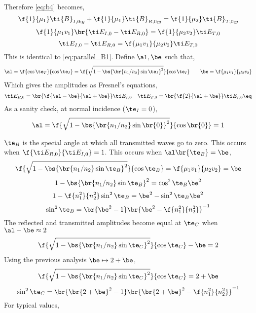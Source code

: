 \documentclass{article}
\begin{document}
Therefore \cref{eq:b4} becomes,
\[ \f{1}{\mu_1}\ti {B}_{I, 0; y} + \f{1}{\mu_1}\ti {B}_{R, 0; y} = \f{1}{\mu_2}\ti {B}_{T, 0; y} \]
\[ \f{1}{\mu_1v_1}\br{\ti E_{I, 0} - \ti E_{R, 0}} = \f{1}{\mu_2 v_2} \ti E_{T, 0} \]
\[ \ti E_{I, 0} - \ti E_{R, 0} = \f{\mu_1 v_1}{\mu_2 v_2} \ti E_{T, 0} \]
This is identical to \cref{eq:parallel_B1}. Define $\al, \be$ such that,
\[ \al = \f{\cos \te_T}{\cos \te_I} = \f{\sqrt{1 - \bs{\br{n_1 /n_2} \sin \te_I}^2}}{\cos \te_I} \qquad \be = \f{\mu_1 v_1}{\mu_2 v_2} \]
Which gives the amplitudes as Fresnel's equations,
\[ \ti E_{R,0} = \br{\f{\al - \be}{\al + \be}} \ti E_{I,0} \quad \ti E_{T,0} = \br{\f{2}{\al + \be}} \ti E_{I,0} \eq \label{eq:fresnel_parallel}\]
As a sanity check, at normal incidence ($\te_I = 0$),
\[ \al = \f{\sqrt{1 - \bs{\br{n_1 / n_2} \sin \br{0}}^2}}{\cos \br{0}} = 1 \]

 $\te_B$ is the special angle at which all transmitted waves go to zero. This occurs when $\f{\ti E_{R,0}}{\ti E_{I,0}} = 1$. This occurs when $\al\br{\te_B} = \be$,
\[ \f{\sqrt{1 - \bs{\br{n_1 /n_2} \sin \te_B}^2}}{\cos \te_B} = \f{\mu_1 v_1}{\mu_2 v_2} = \be \]
\[ 1 - \bs{\br{n_1 /n_2} \sin \te_B}^2 = \cos^2 \te_B\be^2 \]
\[ 1 - \f{n_1^2}{n_2^2}\sin^2 \te_B = \be^2 - \sin^2 \te_B\be^2 \]
\[ \sin^2 \te_B = \br{\be^2 - 1}\br{\be^2 - \f{n_1^2}{n_2^2}}^{-1}  \]
The reflected and transmitted amplitudes become equal at $\te_C$ when $\al - \be \approx 2$
\[ \f{\sqrt{1 - \bs{\br{n_1 /n_2} \sin \te_C}^2}}{\cos \te_C} - \be = 2\]
Using the previous analysis $\be \mapsto 2 + \be$,
\[ \f{\sqrt{1 - \bs{\br{n_1 /n_2} \sin \te_C}^2}}{\cos \te_C} = 2 + \be\]
\[ \sin^2 \te_C = \br{\br{2+ \be}^2 - 1}\br{\br{2+ \be}^2 - \f{n_1^2}{n_2^2}}^{-1}\]
For typical values,
\begin{center}
\end{center}
\end{document}
